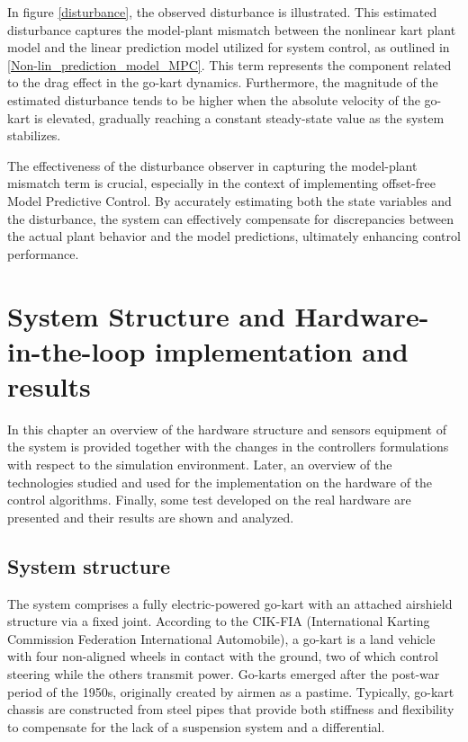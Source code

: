 \documentclass[a4paper,12pt,oneside]{book}
\begin{document}
In figure \ref{disturbance}, the observed disturbance is illustrated. 
This estimated disturbance captures the model-plant mismatch between the nonlinear kart plant model and the linear prediction model utilized for system control, as outlined in \eqref{Non-lin_prediction_model_MPC}.
This term represents the component related to the drag effect in the go-kart dynamics.
Furthermore, the magnitude of the estimated disturbance tends to be higher when the absolute velocity of the go-kart is elevated, gradually reaching a constant steady-state value as the system stabilizes.

The effectiveness of the disturbance observer in capturing the model-plant mismatch term is crucial, especially in the context of implementing offset-free Model Predictive Control. By accurately estimating both the state variables and the disturbance, the system can effectively compensate for discrepancies between the actual plant behavior and the model predictions, ultimately enhancing control performance.

 \chapter{System Structure and Hardware-in-the-loop implementation and results}
In this chapter an overview of the hardware structure and sensors equipment of the system is provided together with the changes in the controllers formulations with respect to the simulation environment. 
Later, an overview of the technologies studied and used for the implementation on the hardware of the control algorithms.
Finally, some test developed on the real hardware are presented and their results are shown and analyzed.

\section{System structure}

The system comprises a fully electric-powered go-kart with an attached airshield structure via a fixed joint. According to the CIK-FIA (International Karting Commission Federation International Automobile), a go-kart is a land vehicle with four non-aligned wheels in contact with the ground, two of which control steering while the others transmit power. Go-karts emerged after the post-war period of the 1950s, originally created by airmen as a pastime. Typically, go-kart chassis are constructed from steel pipes that provide both stiffness and flexibility to compensate for the lack of a suspension system and a differential.
\end{document}
